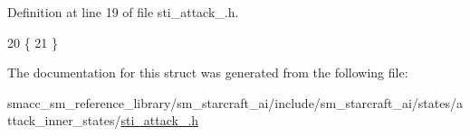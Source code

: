 Definition at line 19 of file sti\+\_\+attack\+\_.\+h.


\begin{DoxyCode}
20   \{
21   \}
\end{DoxyCode}


The documentation for this struct was generated from the following file\+:\begin{DoxyCompactItemize}
\item 
smacc\+\_\+sm\+\_\+reference\+\_\+library/sm\+\_\+starcraft\+\_\+ai/include/sm\+\_\+starcraft\+\_\+ai/states/attack\+\_\+inner\+\_\+states/\hyperlink{sti__attack__1_8h}{sti\+\_\+attack\+\_.\+h}\end{DoxyCompactItemize}
